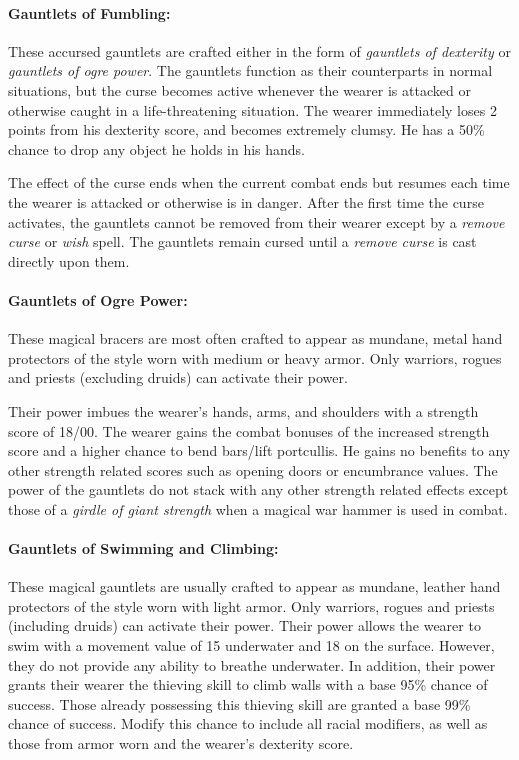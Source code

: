 \begin{multicols}{2}
\paragraph{Gauntlets of Fumbling:} These accursed gauntlets are crafted either in the form of \textit{gauntlets of dexterity} or \textit{gauntlets of ogre power}.  The gauntlets function as their counterparts in normal situations, but the curse becomes active whenever the wearer is attacked or otherwise caught in a life-threatening situation.  The wearer immediately loses 2 points from his dexterity score, and becomes extremely clumsy.  He has a 50\% chance to drop any object he holds in his hands.

The effect of the curse ends when the current combat ends but resumes each time the wearer is attacked or otherwise is in danger.  After the first time the curse activates, the gauntlets cannot be removed from their wearer except by a \textit{remove curse} or \textit{wish} spell.  The gauntlets remain cursed until a \textit{remove curse} is cast directly upon them.

\paragraph{Gauntlets of Ogre Power:} These magical bracers are most often crafted to appear as mundane, metal hand protectors of the style worn with medium or heavy armor.  Only warriors, rogues and priests (excluding druids) can activate their power.  

Their power imbues the wearer's hands, arms, and shoulders with a strength score of 18/00.  The wearer gains the combat bonuses of the increased strength score and a higher chance to bend bars/lift portcullis.  He gains no benefits to any other strength related scores such as opening doors or encumbrance values.  The power of the gauntlets do not stack with any other strength related effects except those of a \textit{girdle of giant strength} when a magical war hammer is used in combat.

\paragraph{Gauntlets of Swimming and Climbing:} These magical gauntlets are usually crafted to appear as mundane, leather hand protectors of the style worn with light armor.  Only warriors, rogues and priests (including druids) can activate their power.  Their power allows the wearer to swim with a movement value of 15 underwater and 18 on the surface.  However, they do not provide any ability to breathe underwater.  In addition, their power grants their wearer the thieving skill to climb walls with a base 95\% chance of success.  Those already possessing this thieving skill are granted a base 99\% chance of success.  Modify this chance to include all racial modifiers, as well as those from armor worn and the wearer's dexterity score.


\end{multicols}
